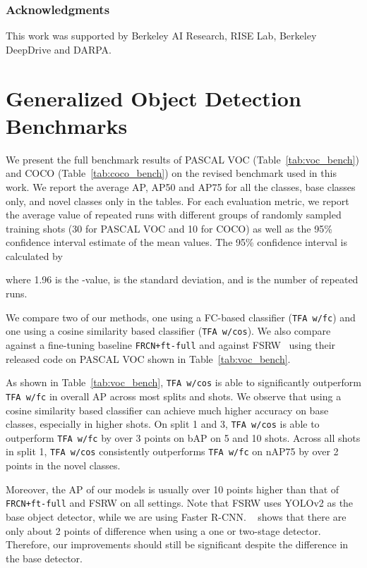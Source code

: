 \documentclass{article}
\newcommand{\model}{TFA\xspace}
\begin{document}
 

\subsubsection*{Acknowledgments}
This work was supported by Berkeley AI Research, RISE Lab, Berkeley DeepDrive and DARPA. 






\appendix
\section{Generalized Object Detection Benchmarks}
We present the full benchmark results of PASCAL VOC (Table~\ref{tab:voc_bench}) and COCO
(Table~\ref{tab:coco_bench}) on the revised benchmark used in this work. We report the average AP, AP50 and AP75 for all the classes, base classes only, and novel classes only in the tables. For each evaluation metric, we report the average value of  repeated runs with different groups of randomly sampled training shots (30 for PASCAL VOC and 10 for COCO) as well as the 95\% confidence interval estimate of the mean values.  The 95\% confidence interval is calculated by 

where 1.96 is the -value,  is the standard deviation, and  is the number of repeated runs.

We compare two of our methods, one using a FC-based classifier (\texttt{\model w/fc}) and one using a cosine similarity based classifier (\texttt{\model w/cos}). We also compare against a fine-tuning baseline \texttt{FRCN+ft-full} and against FSRW~\cite{kang2019few} using their released code on PASCAL VOC shown in Table~\ref{tab:voc_bench}. 

As shown in Table~\ref{tab:voc_bench},
\texttt{\model w/cos} is able to significantly outperform \texttt{\model w/fc} in overall AP across most splits and shots.
We observe that using a cosine similarity based classifier can achieve much higher accuracy on base classes, especially in higher shots.
On split 1 and 3, \texttt{\model w/cos} is able to outperform \texttt{\model w/fc} by over 3 points on bAP on 5 and 10 shots.
Across all shots in split 1, \texttt{\model w/cos} consistently outperforms \texttt{\model w/fc} on nAP75 by over 2 points in the novel classes. 

Moreover, the AP of our models is usually over 10 points higher than that of \texttt{FRCN+ft-full} and FSRW on all settings. Note that FSRW uses YOLOv2 as the base object detector, while we are using Faster R-CNN. ~\citet{wang2019meta} shows that there are only about 2 points of difference when using a one or two-stage detector. Therefore, our improvements should still be significant despite the difference in the base detector.
\end{document}
